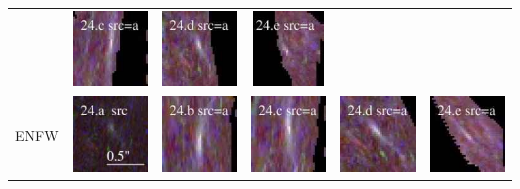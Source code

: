 \documentclass[useAMS,usenatbib]{mn2e}
\begin{document}
\begin{table}
\begin{tabular}{cccccc}
    & \multicolumn{1}{m{1.7cm}}{\includegraphics[height=2.00cm,clip]{figs/nsie_img/rgb.pre_24_c_a_tri.ps}}
    & \multicolumn{1}{m{1.7cm}}{\includegraphics[height=2.00cm,clip]{figs/nsie_img/rgb.pre_24_d_a_tri.ps}}
    & \multicolumn{1}{m{1.7cm}}{\includegraphics[height=2.00cm,clip]{figs/nsie_img/rgb.pre_24_e_a_tri.ps}} \\
    \multicolumn{1}{m{1cm}}{{\Large ENFW}}
    & \multicolumn{1}{m{1.7cm}}{\includegraphics[height=2.00cm,clip]{figs/enfw_img/rgb.src_24_a.ps}}
    & \multicolumn{1}{m{1.7cm}}{\includegraphics[height=2.00cm,clip]{figs/enfw_img/rgb.pre_24_b_a_tri.ps}}
    & \multicolumn{1}{m{1.7cm}}{\includegraphics[height=2.00cm,clip]{figs/enfw_img/rgb.pre_24_c_a_tri.ps}}
    & \multicolumn{1}{m{1.7cm}}{\includegraphics[height=2.00cm,clip]{figs/enfw_img/rgb.pre_24_d_a_tri.ps}}
    & \multicolumn{1}{m{1.7cm}}{\includegraphics[height=2.00cm,clip]{figs/enfw_img/rgb.pre_24_e_a_tri.ps}} \\
  \end{tabular}

\end{table}
\end{document}
